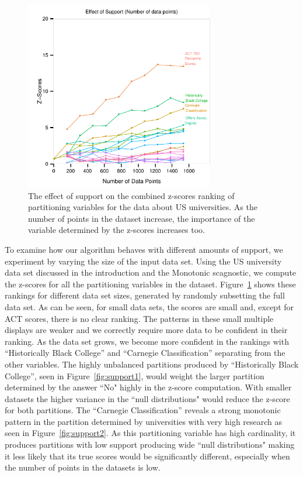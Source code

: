 \begin{figure}
\centering
\includegraphics[width=3.25in,height=3.25in]{images/support-nogrid.pdf}
  \caption{The effect of support on the combined z-scores ranking of partitioning variables for the data about US universities. As the number of points in the dataset increase, the importance of the variable determined by the z-scores increases too. }
 \label{fig:support}
\end{figure}

To examine how our algorithm behaves with different amounts of support, we experiment by varying the size of the input data set. Using the US university data set discussed in the introduction and the Monotonic scagnostic, we compute the z-scores for all the partitioning variables in the dataset. Figure~\ref{fig:support} shows these rankings for different data set sizes, generated by randomly subsetting the full data set.
As can be seen, for small data sets, the scores are small and, except for ACT scores, there is no clear ranking. The patterns in these small multiple displays are weaker and we correctly require more data to be confident in their ranking. As the data set grows, we become more confident in the rankings with ``Historically Black College'' and ``Carnegie Classification'' separating from the other variables. The highly unbalanced partitions produced by ``Historically Black College'', seen in Figure~\ref{fig:support1}, would weight the larger partition determined by the answer ``No" highly in the z-score computation. With smaller datasets the higher variance in the ``null distributions" would reduce the z-score for both partitions.
The ``Carnegie Classification'' reveals a strong monotonic pattern in the partition determined by universities with very high research as seen in Figure~\ref{fig:support2}. As this partitioning variable has high cardinality, it produces partitions with low support producing wide ``null distributions" making it less likely that its true scores would be significantly different, especially when the number of points in the datasets is low.

